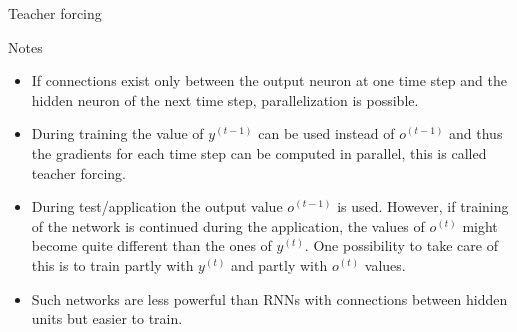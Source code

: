 \begin{frame}{Teacher forcing}
\end{frame}

\begin{frame}[beamer:0]{Notes}
\begin{itemize}
\item If connections exist only between the output neuron at one time step and the hidden neuron of the next time step, parallelization is possible.
\item During training the value of $y^{(t-1)}$ can be used instead of $o^{(t-1)}$ and thus the gradients for each time step can be computed in parallel, this is called teacher forcing.
\item During test/application the output value $o^{(t-1)}$ is used. However, if training of the network is continued during the application, the values of $o^{(t)}$ might become quite different than the ones of $y^{(t)}$. One possibility to take care of this is to train partly with $y^{(t)}$ and partly with $o^{(t)}$ values. 
\item Such networks are less powerful than RNNs with connections between hidden units but easier to train.   
\end{itemize}
\end{frame}

